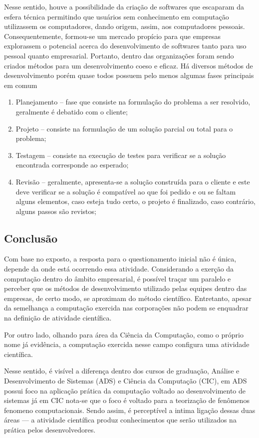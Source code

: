 Nesse sentido, houve a possibilidade da criação de softwares que escaparam da esfera técnica permitindo que usuários sem conhecimento em computação utilizassem os computadores, dando origem, assim, aos computadores pessoais. Consequentemente, formou-se um mercado propício para que empresas explorassem o potencial acerca do desenvolvimento de softwares tanto para uso pessoal quanto empresarial. Portanto, dentro das organizações foram sendo criados métodos para um desenvolvimento coeso e eficaz. Há diversos métodos de desenvolvimento porém quase todos possuem pelo menos algumas fases principais em comum

\begin{enumerate}
    \item Planejamento -- fase que consiste na formulação do problema a ser resolvido, geralmente é debatido com o cliente;
    \item Projeto -- consiste na formulação de um solução parcial ou total para o problema;
    \item Testagem -- consiste na execução de testes para verificar se a solução encontrada corresponde ao esperado;
    \item Revisão -- geralmente, apresenta-se a solução construída para o cliente e este deve verificar se a solução é compatível ao que foi pedido e ou se faltam alguns elementos, caso esteja tudo certo, o projeto é finalizado, caso contrário, alguns passos são revistos;
    
\end{enumerate}
\subsection{Conclusão }

Com base no exposto, a resposta para o questionamento inicial não é única, depende da onde está ocorrendo essa atividade. Considerando a exerção da computação dentro do âmbito empresarial, é possível traçar um paralelo e perceber que os métodos de desenvolvimento utilizado pelas equipes dentro das empresas, de certo modo, se aproximam do método científico. Entretanto, apesar da semelhança a computação exercida nas corporações não podem se enquadrar na definição de atividade científica. 

Por outro lado, olhando para área da Ciência da Computação, como o próprio nome já evidência, a computação exercida nesse campo configura uma atividade científica.

Nesse sentido, é visível a diferença dentro dos cursos de graduação, Análise e Desenvolvimento de Sistemas (ADS) e Ciência da Computação (CIC), em ADS possui foco na aplicação prática da computação voltado ao desenvolvimento de sistemas já em CIC nota-se que o foco é voltado para a teorização de fenômenos \gls{fenomeno} computacionais. Sendo assim, é perceptível a intima ligação dessas duas áreas --- a atividade científica produz conhecimentos que serão utilizados na prática pelos desenvolvedores.

